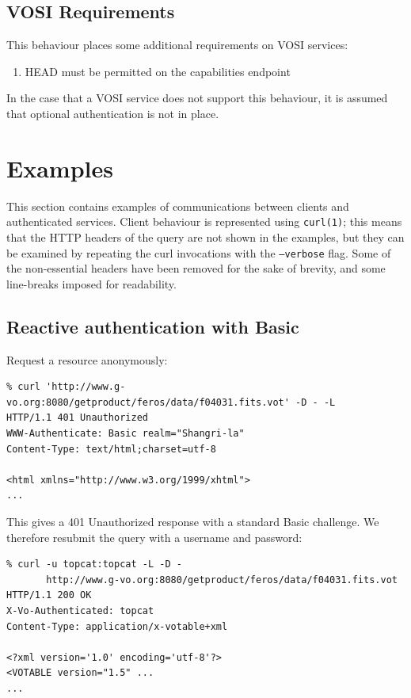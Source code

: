 \documentclass[11pt,a4paper]{ivoa}
\begin{document}
\subsection{VOSI Requirements}

This behaviour places some additional requirements on VOSI services:
\begin{enumerate}
  \item HEAD must be permitted on the capabilities endpoint
\end{enumerate}
In the case that a VOSI service does not support this behaviour,
it is assumed that optional authentication is not in place.

\section{Examples}

This section contains examples of communications between clients
and authenticated services.
Client behaviour is represented using {\tt curl(1)};
this means that the HTTP headers of the query
are not shown in the examples,
but they can be examined by repeating the curl invocations
with the {\tt --verbose} flag.
Some of the non-essential headers have been removed for the sake
of brevity, and some line-breaks imposed for readability.

\subsection{Reactive authentication with Basic}

Request a resource anonymously:
{\footnotesize
\begin{verbatim}
% curl 'http://www.g-vo.org:8080/getproduct/feros/data/f04031.fits.vot' -D - -L
HTTP/1.1 401 Unauthorized
WWW-Authenticate: Basic realm="Shangri-la"
Content-Type: text/html;charset=utf-8

<html xmlns="http://www.w3.org/1999/xhtml">
...
\end{verbatim}
}

\noindent
This gives a 401 Unauthorized response
with a standard Basic challenge.
We therefore resubmit the query with a username and password:
{\footnotesize
\begin{verbatim}
% curl -u topcat:topcat -L -D -
       http://www.g-vo.org:8080/getproduct/feros/data/f04031.fits.vot
HTTP/1.1 200 OK
X-Vo-Authenticated: topcat
Content-Type: application/x-votable+xml

<?xml version='1.0' encoding='utf-8'?>
<VOTABLE version="1.5" ...
...
\end{verbatim}
}
\end{document}
